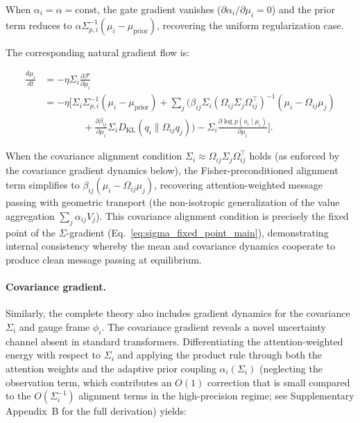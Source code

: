 \documentclass[twoside,11pt]{article}
\begin{document}
When $\alpha_i = \alpha = \text{const}$, the gate gradient vanishes ($\partial\alpha_i/\partial\mu_i = 0$) and the prior term reduces to $\alpha \Sigma_{p,i}^{-1}(\mu_i - \mu_{\text{prior}})$, recovering the uniform regularization case.

The corresponding natural gradient flow is:

\begin{equation}
\boxed{
\begin{aligned}
\frac{d\mu_i}{dt}
&= -\eta \Sigma_i \frac{\partial \mathcal{F}}{\partial \mu_i} \\
&= -\eta \Bigg[
  \Sigma_i\Sigma_{p,i}^{-1}(\mu_i - \mu_{\text{prior}})
  + \sum_j \bigg(
  \beta_{ij} \Sigma_i
  \left(\Omega_{ij}\Sigma_j\Omega_{ij}^\top\right)^{-1}
  (\mu_i - \Omega_{ij}\mu_j) \\
&\qquad\qquad
  + \frac{\partial \beta_{ij}}{\partial \mu_i} \Sigma_i 
  D_{\mathrm{KL}}(q_i \| \Omega_{ij} q_j)
  \bigg)
  - \Sigma_i\frac{\partial \log p(o_i \mid \mu_i)}{\partial \mu_i}
\Bigg].
\end{aligned}
}
\label{eq:natural_gradient_general}
\end{equation}


When the covariance alignment condition $\Sigma_i \approx \Omega_{ij}\Sigma_j\Omega_{ij}^\top$ holds (as enforced by the covariance gradient dynamics below), the Fisher-preconditioned alignment term simplifies to $\beta_{ij}(\mu_i - \Omega_{ij}\mu_j)$, recovering attention-weighted message passing with geometric transport (the non-isotropic generalization of the value aggregation $\sum_j \alpha_{ij} V_j$). This covariance alignment condition is precisely the fixed point of the $\Sigma$-gradient (Eq.~\ref{eq:sigma_fixed_point_main}), demonstrating internal consistency whereby the mean and covariance dynamics cooperate to produce clean message passing at equilibrium.

\paragraph{Covariance gradient.}

Similarly, the complete theory also includes gradient dynamics for the covariance $\Sigma_i$ and gauge frame $\phi_i$. The covariance gradient reveals a novel uncertainty channel absent in standard transformers. Differentiating the attention-weighted energy with respect to $\Sigma_i$ and applying the product rule through both the attention weights and the adaptive prior coupling $\alpha_i(\Sigma_i)$ (neglecting the observation term, which contributes an $O(1)$ correction that is small compared to the $O(\Sigma_i^{-1})$ alignment terms in the high-precision regime; see Supplementary Appendix~B for the full derivation) yields:
\end{document}
